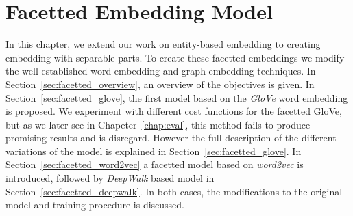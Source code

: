 
\chapter{Facetted Embedding Model}\label{chap:main}
In this chapter, we extend our work on entity-based embedding to creating embedding with separable parts. To create these facetted embeddings we modify the well-established word embedding and graph-embedding techniques. In Section~\ref{sec:facetted_overview}, an overview of the objectives is given. In Section~\ref{sec:facetted_glove}, the first model based on the \emph{GloVe} word embedding is proposed. We experiment with different cost functions for the facetted GloVe, but as we later see in Chapeter~\ref{chap:eval}, this method fails to produce promising results and is disregard. However the full description of the different variations of the model is explained in Section~\ref{sec:facetted_glove}. In Section~\ref{sec:facetted_word2vec} a facetted model based on \emph{word2vec} is introduced, followed by \emph{DeepWalk} based model in Section~\ref{sec:facetted_deepwalk}. In both cases, the modifications to the original model and training procedure is discussed. 


